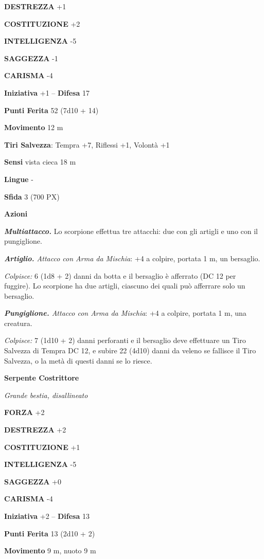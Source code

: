 \begin{multicols}{2}
\textbf{DESTREZZA} +1

\textbf{COSTITUZIONE} +2

\textbf{INTELLIGENZA} -5

\textbf{SAGGEZZA} -1

\textbf{CARISMA} -4

\textbf{Iniziativa} +1 -- \textbf{Difesa} 17

\textbf{Punti Ferita} 52 (7d10 + 14)

\textbf{Movimento} 12 m

\textbf{Tiri Salvezza}: Tempra +7, Riflessi +1, Volontà +1

\textbf{Sensi} vista cieca 18 m

\textbf{Lingue} -

\textbf{Sfida} 3 (700 PX)

\textbf{Azioni}

\textit{\textbf{Multiattacco.}} Lo scorpione effettua tre attacchi: due con gli artigli e uno con il pungiglione.

\textit{\textbf{Artiglio.} Attacco con Arma da Mischia}: +4 a colpire, portata 1 m, un bersaglio.

\textit{Colpisce:} 6 (1d8 + 2) danni da botta e il bersaglio è afferrato (DC 12 per fuggire). Lo scorpione ha due artigli, ciascuno dei quali può afferrare solo un bersaglio.

\textit{\textbf{Pungiglione.} Attacco con Arma da Mischia}: +4 a colpire, portata 1 m, una creatura.

\textit{Colpisce:} 7 (1d10 + 2) danni perforanti e il bersaglio deve effettuare un Tiro Salvezza di Tempra DC 12, e subire 22 (4d10) danni da veleno se fallisce il Tiro Salvezza, o la metà di questi danni se lo riesce.

\medskip\textbf{Serpente Costrittore}

\textit{Grande bestia, disallineato}

\textbf{FORZA} +2

\textbf{DESTREZZA} +2

\textbf{COSTITUZIONE} +1

\textbf{INTELLIGENZA} -5

\textbf{SAGGEZZA} +0

\textbf{CARISMA} -4

\textbf{Iniziativa} +2 -- \textbf{Difesa} 13

\textbf{Punti Ferita} 13 (2d10 + 2)

\textbf{Movimento} 9 m, nuoto 9 m


\end{multicols}
